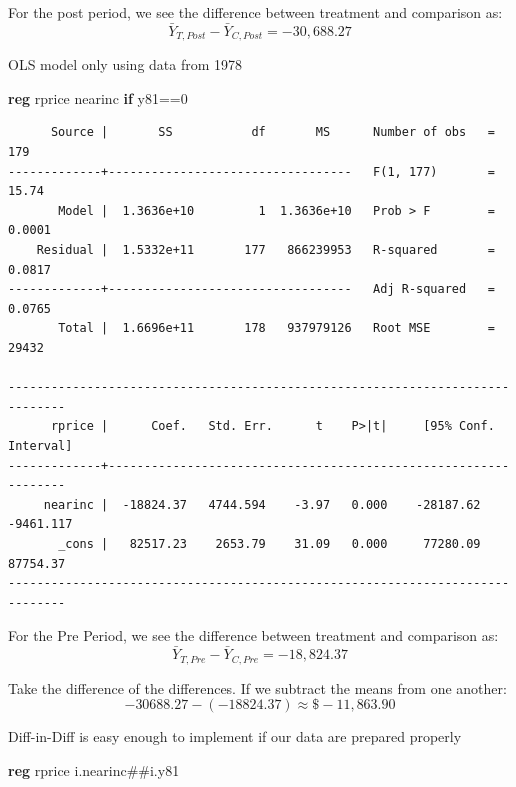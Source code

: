 \documentclass[
]{book}
\newenvironment{Shaded}{\begin{snugshade}}{\end{snugshade}}
\newcommand{\KeywordTok}[1]{\textcolor[rgb]{0.13,0.29,0.53}{\textbf{#1}}}
\newcommand{\NormalTok}[1]{#1}
\begin{document}
For the post period, we see the difference between treatment and comparison as: \[ \bar{Y}_{T,Post} - \bar{Y}_{C,Post} = -30,688.27 \]

OLS model only using data from 1978

\begin{Shaded}
\begin{Highlighting}[]
\KeywordTok{reg}\NormalTok{ rprice nearinc }\KeywordTok{if}\NormalTok{ y81==0}
\end{Highlighting}
\end{Shaded}

\begin{verbatim}
      Source |       SS           df       MS      Number of obs   =       179
-------------+----------------------------------   F(1, 177)       =     15.74
       Model |  1.3636e+10         1  1.3636e+10   Prob > F        =    0.0001
    Residual |  1.5332e+11       177   866239953   R-squared       =    0.0817
-------------+----------------------------------   Adj R-squared   =    0.0765
       Total |  1.6696e+11       178   937979126   Root MSE        =     29432

------------------------------------------------------------------------------
      rprice |      Coef.   Std. Err.      t    P>|t|     [95% Conf. Interval]
-------------+----------------------------------------------------------------
     nearinc |  -18824.37   4744.594    -3.97   0.000    -28187.62   -9461.117
       _cons |   82517.23    2653.79    31.09   0.000     77280.09    87754.37
------------------------------------------------------------------------------
\end{verbatim}

For the Pre Period, we see the difference between treatment and comparison as: \[ \bar{Y}_{T,Pre} - \bar{Y}_{C,Pre}=-18,824.37 \]

Take the difference of the differences. If we subtract the means from one another: \[ -30688.27 - (-18824.37) \approx \$ -11,863.90 \]

Diff-in-Diff is easy enough to implement if our data are prepared properly

\begin{Shaded}
\begin{Highlighting}[]
\KeywordTok{reg}\NormalTok{ rprice i.nearinc\#\#i.y81}
\end{Highlighting}
\end{Shaded}
\end{document}
